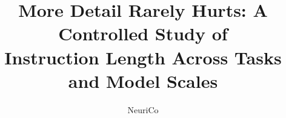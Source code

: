 \documentclass{article}
\title{More Detail Rarely Hurts: A Controlled Study of\\Instruction Length Across Tasks and Model Scales}
\author{NeuriCo}
\begin{document}
\maketitle

\begin{abstract}

\end{abstract}










\appendix

\end{document}
